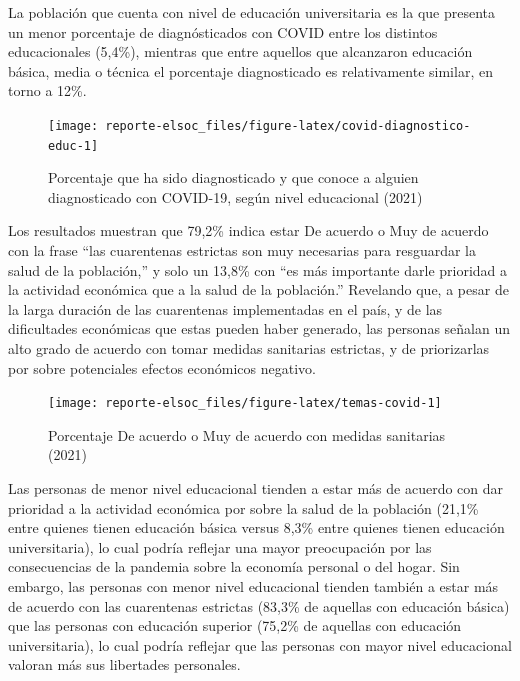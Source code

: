 \documentclass[
  12pt,
]{book}
\begin{document}
La población que cuenta con nivel de educación universitaria es la que presenta un menor porcentaje de diagnósticados con COVID entre los distintos educacionales (5,4\%), mientras que entre aquellos que alcanzaron educación básica, media o técnica el porcentaje diagnosticado es relativamente similar, en torno a 12\%.

\begin{figure}

{\centering \texttt{[image: reporte-elsoc\_files/figure-latex/covid-diagnostico-educ-1]} 

}

\caption{Porcentaje que ha sido diagnosticado y que conoce a alguien diagnosticado con COVID-19, según nivel educacional (2021)}\label{fig:covid-diagnostico-educ}
\end{figure}

Los resultados muestran que 79,2\% indica estar De acuerdo o Muy de acuerdo con la frase ``las cuarentenas estrictas son muy necesarias para resguardar la salud de la población,'' y solo un 13,8\% con ``es más importante darle prioridad a la actividad económica que a la salud de la población.'' Revelando que, a pesar de la larga duración de las cuarentenas implementadas en el país, y de las dificultades económicas que estas pueden haber generado, las personas señalan un alto grado de acuerdo con tomar medidas sanitarias estrictas, y de priorizarlas por sobre potenciales efectos económicos negativo.

\begin{figure}

{\centering \texttt{[image: reporte-elsoc\_files/figure-latex/temas-covid-1]} 

}

\caption{Porcentaje De acuerdo o Muy de acuerdo con medidas sanitarias (2021)}\label{fig:temas-covid}
\end{figure}

Las personas de menor nivel educacional tienden a estar más de acuerdo con dar prioridad a la actividad económica por sobre la salud de la población (21,1\% entre quienes tienen educación básica versus 8,3\% entre quienes tienen educación universitaria), lo cual podría reflejar una mayor preocupación por las consecuencias de la pandemia sobre la economía personal o del hogar. Sin embargo, las personas con menor nivel educacional tienden también a estar más de acuerdo con las cuarentenas estrictas (83,3\% de aquellas con educación básica) que las personas con educación superior (75,2\% de aquellas con educación universitaria), lo cual podría reflejar que las personas con mayor nivel educacional valoran más sus libertades personales.
\end{document}
